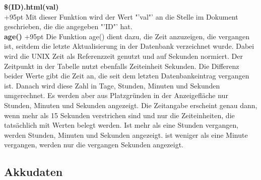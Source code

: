 \documentclass[fontsize = 12pt, paper = a4]{scrreprt}
\begin{document}
\textbf{\$(ID).html(val)}\\
\hangindent+95pt  
Mit dieser Funktion wird der Wert "'val"' an die Stelle im Dokument geschrieben, die die angegeben "'ID"' hat.\\


\textbf{age()}
\hspace{20mm}
\hangindent+95pt  
Die Funktion age() dient dazu, die Zeit anzuzeigen, die vergangen ist, seitdem die letzte Aktualisierung in der Datenbank verzeichnet wurde. Dabei wird die UNIX Zeit als Referenzzeit genutzt und auf Sekunden normiert. Der Zeitpunkt in der Tabelle nutzt ebenfalls Zeiteinheit Sekunden. Die Differenz beider Werte gibt die Zeit an, die seit dem letzten Datenbankeintrag vergangen ist. Danach wird diese Zahl in Tage, Stunden, Minuten und Sekunden umgerechnet. Es werden aber aus Platzgründen in der Anzeigefläche nur Stunden, Minuten und Sekunden angezeigt. Die Zeitangabe erscheint genau dann, wenn mehr als 15 Sekunden verstrichen sind und nur die Zeiteinheiten, die tatsächlich mit Werten belegt werden. Ist mehr als eine Stunden vergangen, werden Stunden, Minuten und Sekunden angezeigt. ist weniger als eine Minute vergangen, werden nur die vergangen Sekunden angezeigt.\\ 





\subsection{Akkudaten}
\end{document}
